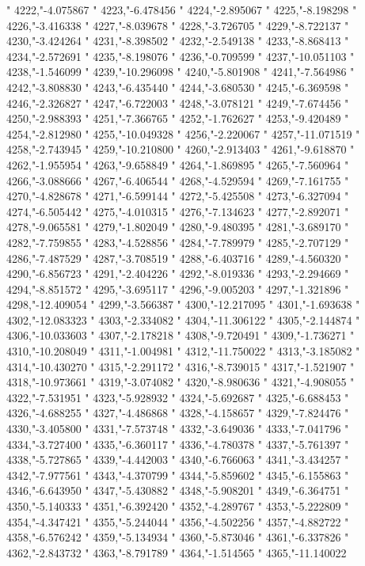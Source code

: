 "
4222,"-4.075867
"
4223,"-6.478456
"
4224,"-2.895067
"
4225,"-8.198298
"
4226,"-3.416338
"
4227,"-8.039678
"
4228,"-3.726705
"
4229,"-8.722137
"
4230,"-3.424264
"
4231,"-8.398502
"
4232,"-2.549138
"
4233,"-8.868413
"
4234,"-2.572691
"
4235,"-8.198076
"
4236,"-0.709599
"
4237,"-10.051103
"
4238,"-1.546099
"
4239,"-10.296098
"
4240,"-5.801908
"
4241,"-7.564986
"
4242,"-3.808830
"
4243,"-6.435440
"
4244,"-3.680530
"
4245,"-6.369598
"
4246,"-2.326827
"
4247,"-6.722003
"
4248,"-3.078121
"
4249,"-7.674456
"
4250,"-2.988393
"
4251,"-7.366765
"
4252,"-1.762627
"
4253,"-9.420489
"
4254,"-2.812980
"
4255,"-10.049328
"
4256,"-2.220067
"
4257,"-11.071519
"
4258,"-2.743945
"
4259,"-10.210800
"
4260,"-2.913403
"
4261,"-9.618870
"
4262,"-1.955954
"
4263,"-9.658849
"
4264,"-1.869895
"
4265,"-7.560964
"
4266,"-3.088666
"
4267,"-6.406544
"
4268,"-4.529594
"
4269,"-7.161755
"
4270,"-4.828678
"
4271,"-6.599144
"
4272,"-5.425508
"
4273,"-6.327094
"
4274,"-6.505442
"
4275,"-4.010315
"
4276,"-7.134623
"
4277,"-2.892071
"
4278,"-9.065581
"
4279,"-1.802049
"
4280,"-9.480395
"
4281,"-3.689170
"
4282,"-7.759855
"
4283,"-4.528856
"
4284,"-7.789979
"
4285,"-2.707129
"
4286,"-7.487529
"
4287,"-3.708519
"
4288,"-6.403716
"
4289,"-4.560320
"
4290,"-6.856723
"
4291,"-2.404226
"
4292,"-8.019336
"
4293,"-2.294669
"
4294,"-8.851572
"
4295,"-3.695117
"
4296,"-9.005203
"
4297,"-1.321896
"
4298,"-12.409054
"
4299,"-3.566387
"
4300,"-12.217095
"
4301,"-1.693638
"
4302,"-12.083323
"
4303,"-2.334082
"
4304,"-11.306122
"
4305,"-2.144874
"
4306,"-10.033603
"
4307,"-2.178218
"
4308,"-9.720491
"
4309,"-1.736271
"
4310,"-10.208049
"
4311,"-1.004981
"
4312,"-11.750022
"
4313,"-3.185082
"
4314,"-10.430270
"
4315,"-2.291172
"
4316,"-8.739015
"
4317,"-1.521907
"
4318,"-10.973661
"
4319,"-3.074082
"
4320,"-8.980636
"
4321,"-4.908055
"
4322,"-7.531951
"
4323,"-5.928932
"
4324,"-5.692687
"
4325,"-6.688453
"
4326,"-4.688255
"
4327,"-4.486868
"
4328,"-4.158657
"
4329,"-7.824476
"
4330,"-3.405800
"
4331,"-7.573748
"
4332,"-3.649036
"
4333,"-7.041796
"
4334,"-3.727400
"
4335,"-6.360117
"
4336,"-4.780378
"
4337,"-5.761397
"
4338,"-5.727865
"
4339,"-4.442003
"
4340,"-6.766063
"
4341,"-3.434257
"
4342,"-7.977561
"
4343,"-4.370799
"
4344,"-5.859602
"
4345,"-6.155863
"
4346,"-6.643950
"
4347,"-5.430882
"
4348,"-5.908201
"
4349,"-6.364751
"
4350,"-5.140333
"
4351,"-6.392420
"
4352,"-4.289767
"
4353,"-5.222809
"
4354,"-4.347421
"
4355,"-5.244044
"
4356,"-4.502256
"
4357,"-4.882722
"
4358,"-6.576242
"
4359,"-5.134934
"
4360,"-5.873046
"
4361,"-6.337826
"
4362,"-2.843732
"
4363,"-8.791789
"
4364,"-1.514565
"
4365,"-11.140022
